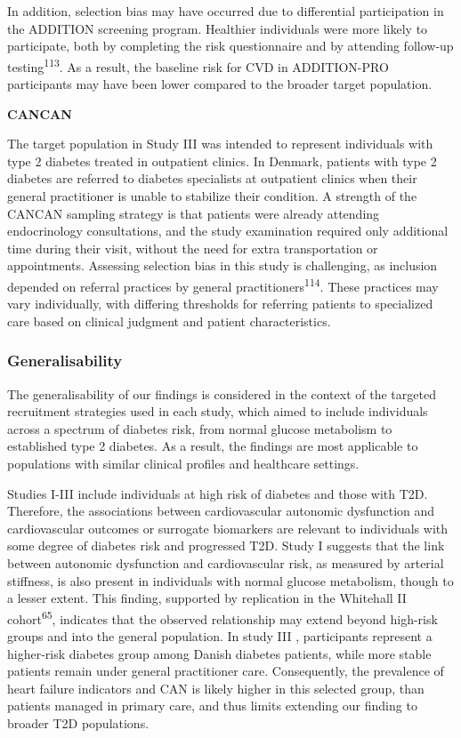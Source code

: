 \documentclass[
  a4paper,
  headsepline=true,
  open=any]{scrbook}
\begin{document}
In addition, selection bias may have occurred due to differential
participation in the ADDITION screening program. Healthier individuals
were more likely to participate, both by completing the risk
questionnaire and by attending follow-up testing\textsuperscript{113}.
As a result, the baseline risk for CVD in ADDITION-PRO participants may
have been lower compared to the broader target population.

\textbf{CANCAN}

The target population in Study III was intended to represent individuals
with type 2 diabetes treated in outpatient clinics. In Denmark, patients
with type 2 diabetes are referred to diabetes specialists at outpatient
clinics when their general practitioner is unable to stabilize their
condition. A strength of the CANCAN sampling strategy is that patients
were already attending endocrinology consultations, and the study
examination required only additional time during their visit, without
the need for extra transportation or appointments. Assessing selection
bias in this study is challenging, as inclusion depended on referral
practices by general practitioners\textsuperscript{114}. These practices
may vary individually, with differing thresholds for referring patients
to specialized care based on clinical judgment and patient
characteristics.

\hypertarget{generalisability}{%
\subsubsection{Generalisability}\label{generalisability}}

The generalisability of our findings is considered in the context of the
targeted recruitment strategies used in each study, which aimed to
include individuals across a spectrum of diabetes risk, from normal
glucose metabolism to established type 2 diabetes. As a result, the
findings are most applicable to populations with similar clinical
profiles and healthcare settings.

Studies I-III include individuals at high risk of diabetes and those
with T2D. Therefore, the associations between cardiovascular autonomic
dysfunction and cardiovascular outcomes or surrogate biomarkers are
relevant to individuals with some degree of diabetes risk and progressed
T2D. Study I suggests that the link between autonomic dysfunction and
cardiovascular risk, as measured by arterial stiffness, is also present
in individuals with normal glucose metabolism, though to a lesser
extent. This finding, supported by replication in the Whitehall II
cohort\textsuperscript{65}, indicates that the observed relationship may
extend beyond high-risk groups and into the general population. In study
III , participants represent a higher-risk diabetes group among Danish
diabetes patients, while more stable patients remain under general
practitioner care. Consequently, the prevalence of heart failure
indicators and CAN is likely higher in this selected group, than
patients managed in primary care, and thus limits extending our finding
to broader T2D populations.
\end{document}
